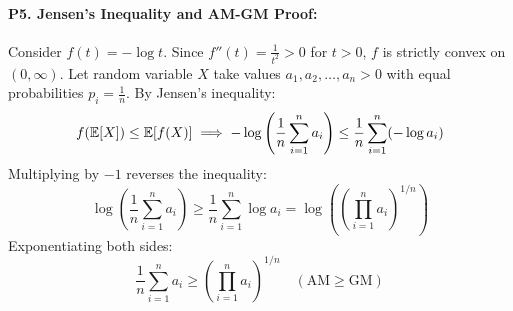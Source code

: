 \paragraph{P5. Jensen's Inequality and AM-GM Proof:}
Consider $f(t) = -\log t$. Since $f''(t) = \frac{1}{t^2} > 0$ for $t > 0$, $f$ is strictly convex on $(0, \infty)$.
Let random variable $X$ take values $a_1, a_2, \dots, a_n > 0$ with equal probabilities $p_i = \frac{1}{n}$.
By Jensen's inequality:
\begin{equation*}
f(\operatorname{\mathbb{E}}[X]) \le \operatorname{\mathbb{E}}[f(X)] \implies -\log\left( \frac{1}{n}\sum_{i=1}^n a_i \right) \le \frac{1}{n}\sum_{i=1}^n (-\log a_i)
\end{equation*}
Multiplying by $-1$ reverses the inequality:
\begin{equation*}
\log\left( \frac{1}{n}\sum_{i=1}^n a_i \right) \ge \frac{1}{n}\sum_{i=1}^n \log a_i = \log\left( \left(\prod_{i=1}^n a_i\right)^{1/n} \right)
\end{equation*}
Exponentiating both sides:
\begin{equation*}
\frac{1}{n}\sum_{i=1}^n a_i \ge \left( \prod_{i=1}^n a_i \right)^{1/n} \quad (\text{AM} \ge \text{GM})
\end{equation*}

